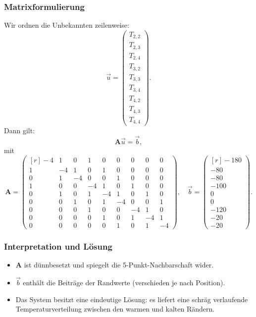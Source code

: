 \subsubsection*{Matrixformulierung}
Wir ordnen die Unbekannten zeilenweise:
\[
\vec{u} =
\begin{pmatrix}
	T_{2,2}\\T_{2,3}\\T_{2,4}\\
	T_{3,2}\\T_{3,3}\\T_{3,4}\\
	T_{4,2}\\T_{4,3}\\T_{4,4}
\end{pmatrix}.
\]
Dann gilt:
\[
\mathbf{A}\vec{u}=\vec{b},
\]
mit
\[
\mathbf{A}=
\begin{pmatrix*}[r]
	-4& 1& 0& 1& 0& 0& 0& 0& 0\\
	1&-4& 1& 0& 1& 0& 0& 0& 0\\
	0& 1&-4& 0& 0& 1& 0& 0& 0\\
	1& 0& 0&-4& 1& 0& 1& 0& 0\\
	0& 1& 0& 1&-4& 1& 0& 1& 0\\
	0& 0& 1& 0& 1&-4& 0& 0& 1\\
	0& 0& 0& 1& 0& 0&-4& 1& 0\\
	0& 0& 0& 0& 1& 0& 1&-4& 1\\
	0& 0& 0& 0& 0& 1& 0& 1&-4
\end{pmatrix*},
\quad
\vec{b}=
\begin{pmatrix*}[r]
	-180\\-80\\-80\\
	-100\\0\\0\\
	-120\\-20\\-20
\end{pmatrix*}.
\]

\subsubsection*{Interpretation und Lösung}
\begin{itemize}
	\item $\mathbf{A}$ ist dünnbesetzt und spiegelt die 5-Punkt-Nachbarschaft wider.
	\item $\vec{b}$ enthält die Beiträge der Randwerte (verschieden je nach Position).
	\item Das System besitzt eine eindeutige Lösung: es liefert eine schräg verlaufende Temperaturverteilung zwischen den warmen und kalten Rändern.
\end{itemize}

